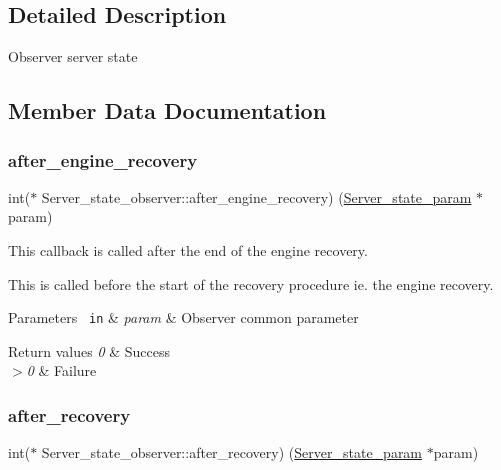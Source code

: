 \subsection{Detailed Description}
Observer server state 

\subsection{Member Data Documentation}
\mbox{\label{structServer__state__observer_a771b6a4ff00a09b67cff5aea530c653b}} 
\subsubsection{\texorpdfstring{after\+\_\+engine\+\_\+recovery}{after\_engine\_recovery}}
{\footnotesize\ttfamily int($\ast$ Server\+\_\+state\+\_\+observer\+::after\+\_\+engine\+\_\+recovery) (\mbox{\hyperlink{structServer__state__param}{Server\+\_\+state\+\_\+param}} $\ast$param)}

This callback is called after the end of the engine recovery.

This is called before the start of the recovery procedure ie. the engine recovery.


\begin{DoxyParams}[1]{Parameters}
\mbox{\texttt{ in}}  & {\em param} & Observer common parameter\\
\hline
\end{DoxyParams}

\begin{DoxyRetVals}{Return values}
{\em 0} & Success \\
\hline
{\em $>$0} & Failure \\
\hline
\end{DoxyRetVals}
\mbox{\label{structServer__state__observer_a38fea82c3736104783402e90603c102a}} 
\subsubsection{\texorpdfstring{after\+\_\+recovery}{after\_recovery}}
{\footnotesize\ttfamily int($\ast$ Server\+\_\+state\+\_\+observer\+::after\+\_\+recovery) (\mbox{\hyperlink{structServer__state__param}{Server\+\_\+state\+\_\+param}} $\ast$param)}

